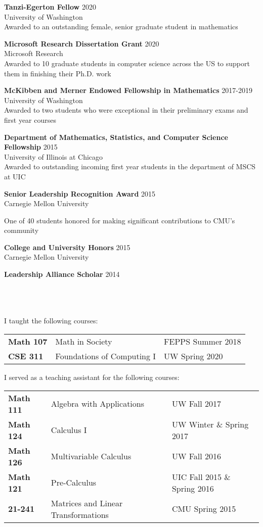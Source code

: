 \documentclass[12 pt]{article}
\newcommand{\lineunder}{\vspace*{-8pt} \\ \hspace*{-18pt} \hrulefill \\}
\newcommand{\header}[1]{{\hspace*{-15pt}\vspace*{6pt} \selectfont{\textsc{#1}}} \vspace*{-6pt} \lineunder}
\newcommand{\employer}[3]{{ \textbf{#1} \hfill #2 \\ #3\\  }}
\begin{document}
\employer{Tanzi-Egerton Fellow}{2020}{University of Washington}
\smallskip
Awarded to an outstanding female, senior graduate student in mathematics\\

\bigskip

\employer{Microsoft Research Dissertation Grant}{2020}{Microsoft Research}
Awarded to 10 graduate students in computer science across the US to support them in finishing their Ph.D. work
\bigskip

\employer{McKibben and Merner Endowed Fellowship in Mathematics}{2017-2019}{University of Washington}
\smallskip
Awarded to two students who were exceptional in their preliminary exams 
and first year courses\\
\bigskip

\employer{Department of Mathematics, Statistics, and Computer Science Fellowship}{2015}{University of Illinois at Chicago}
\smallskip
Awarded to outstanding incoming first year students in the department of MSCS at UIC\\
\bigskip


\employer{Senior Leadership Recognition Award}{2015}{Carnegie Mellon University}

\smallskip

One of 40 students honored for making significant contributions to CMU's community 
 \bigskip

 \employer{College and University Honors}{2015}{Carnegie Mellon University}

\bigskip

 \employer{Leadership Alliance Scholar}{2014}{~}
 \bigskip


\header{Teaching}

I taught the following courses:
\begin{center}
	\begin{tabular}{ l l l }
	  \textbf{Math 107}& Math in Society & FEPPS Summer 2018 \\ 
	  \textbf{CSE 311}&	 Foundations of Computing I & UW Spring 2020 	
	\end{tabular}
\end{center}

I served as a teaching assistant for the following courses:
\begin{center}
	\begin{tabular}{ l l l }
	  \textbf{Math 111}& Algebra with Applications & UW Fall 2017 \\ 
	  \textbf{Math 124}&	 Calculus I & UW Winter  \& Spring 2017  \\  
	 \textbf{Math 126} &    Multivariable Calculus   & UW Fall 2016    \\
	\textbf{Math 121}	& Pre-Calculus	& UIC Fall 2015 \& Spring 2016\\	
	\textbf{21-241}	&	Matrices and Linear Transformations & CMU Spring 2015 	
	\end{tabular}
\end{center}
\end{document}
